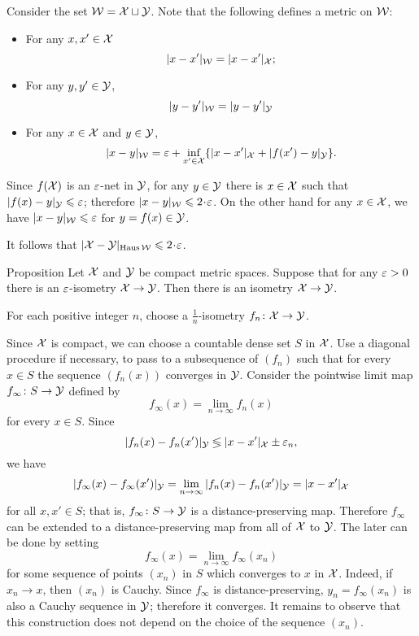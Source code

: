  Consider the set $\mathcal{W}=\mathcal{X}\sqcup \mathcal{Y}$.
Note that the following defines a metric on $\mathcal{W}$:
\begin{itemize}
\item  For any $x,x'\in \mathcal{X}$
$$|x-x'|_{\mathcal{W}}=|x-x'|_{\mathcal{X}};$$
\item For any $y,y'\in \mathcal{Y}$,
$$|y-y'|_{\mathcal{W}}=|y-y'|_{\mathcal{Y}}$$
\item For any $x\in \mathcal{X}$ and $y\in \mathcal{Y}$,
$$|x-y|_{\mathcal{W}}=\varepsilon+\inf_{x'\in \mathcal{X}}\{|x-x'|_{\mathcal{X}}+|f(x')-y|_{\mathcal{Y}}\}.$$
\end{itemize}

Since $f(\mathcal{X})$ is an $\varepsilon$-net in $\mathcal{Y}$,
for any $y\in \mathcal{Y}$ there is $x\in \mathcal{X}$ such that $|f(x)-y|_{\spc{Y}}\z\le\eps$;
therefore $|x-y|_{\spc{W}}\le 2\cdot\eps$.
On the other hand for any $x\in \mathcal{X}$, we have $|x-y|_{\mathcal{W}}\leqslant\varepsilon$
for $y=f(x)\in \mathcal{Y}$.

It follows that $|\spc{X}-\spc{Y}|_{\Haus\spc{W}}\le 2\cdot\eps$.
\qedsf

\begin{thm}{Proposition}\label{prop:eps-isometry=isometry}
Let $\mathcal{X}$ and $\mathcal{Y}$ be compact metric spaces.
Suppose that for any $\varepsilon>0$ there is an $\varepsilon$-isometry $\mathcal{X}\to\mathcal{Y}$.
Then there is an isometry $\mathcal{X}\to\mathcal{Y}$.
\end{thm}

For each positive integer $n$, choose a $\tfrac1n$-isometry $f_n\colon\mathcal{X}\to\mathcal{Y}$.

Since $\mathcal{X}$ is compact, 
we can choose a countable dense set
$S$ in $\mathcal{X}$.
Use a diagonal procedure if necessary, to pass to a subsequence of $(f_n)$
such that for every $x \in S$ the sequence $(f_n(x))$ 
converges in $\mathcal{Y}$. 
Consider the pointwise limit map  $f_\infty \colon S \to \mathcal{Y}$ defined by
 $$f_\infty(x) = \lim_{n\to\infty} f_n (x)$$ for every $x \in S$. 
Since $$|f_n (x)- f_n (x')|_{\mathcal{Y}}\lessgtr |x- x'|_{\mathcal{X}} \pm\varepsilon_n,$$ 
we have 
$$|f_\infty(x)-f_\infty (x')|_{\mathcal{Y}} 
= \lim_{n\to\infty} |f_n(x)-f_n (x')|_{\mathcal{Y}} 
= |x -x'|_{\mathcal{X}}$$ for all
$x, x' \in S$; 
that is, $f_\infty\colon S\to \mathcal{Y}$ is a distance-preserving map. 
Therefore $f_\infty$ can be extended to a distance-preserving map from all of $\mathcal{X}$ to $\mathcal{Y}$.
The later can be done by setting 
$$f_\infty(x)=\lim_{n\to\infty} f_\infty(x_n)$$ 
for some sequence of points $(x_n)$ in $S$
which converges to $x$ in $\mathcal{X}$.
Indeed, if $x_n\to x$, then $(x_n)$ is Cauchy.
Since $f_\infty$ is distance-preserving, $y_n=f_\infty(x_n)$ is also a Cauchy sequence in $\mathcal{Y}$;
therefore it converges.
It remains to observe that this construction does not depend on the choice of the sequence $(x_n)$.

